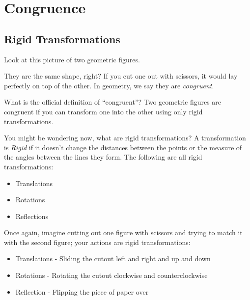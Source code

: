 \chapter{Congruence}
\section{Rigid Transformations}

Look at this picture of two geometric figures.


They are the same shape, right? If you cut one out with scissors, it
would lay perfectly on top of the other. In geometry, we say they are
\emph{congruent}.

What is the official definition of ``congruent''? 
Two geometric figures are congruent if you can transform one into the other using
only rigid transformations. 

You might be wondering now, what are rigid transformations?
A transformation is \emph{Rigid} if it doesn't change the distances
between the points or the measure of the angles between the lines they
form. The following are all rigid transformations:
\begin{itemize}
\item Translations
\item Rotations
\item Reflections 
\end{itemize}

Once again, imagine cutting out one figure with scissors and trying to match it with the second figure; your actions are rigid transformations:
\begin{itemize}
\item Translations - Sliding the cutout left and right and up and down
\item Rotations	- Rotating the cutout clockwise and counterclockwise
\item Reflection - Flipping the piece of paper over
\end{itemize}

